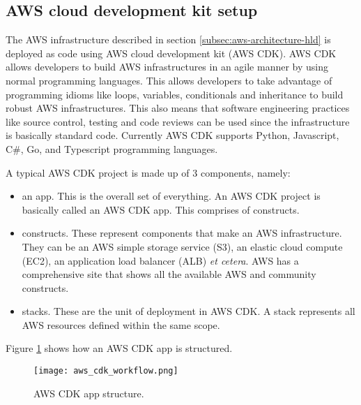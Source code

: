 


\subsection{AWS cloud development kit setup}
\label{subsec:aws-cdk-setup}

The AWS infrastructure described in section \ref{subsec:aws-architecture-hld} is deployed as code using AWS cloud development kit (AWS CDK). AWS CDK allows developers to build AWS infrastructures in an agile manner by using normal programming languages. This allows developers to take advantage of programming idioms like loops, variables, conditionals and inheritance to build robust AWS infrastructures. This also means that software engineering practices like source control, testing and code reviews can be used since the infrastructure is basically standard code. Currently AWS CDK supports Python, Javascript, C\#, Go, and Typescript programming languages.

A typical AWS CDK project is made up of 3 components, namely:

\begin{itemize}
    \item an app. This is the overall set of everything. An AWS CDK project is basically called an AWS CDK app. This comprises of constructs.
    \item constructs. These represent components that make an AWS infrastructure. They can be an AWS simple storage service (S3), an elastic cloud compute (EC2), an application load balancer (ALB) \textit{et cetera}. AWS has a comprehensive site that shows all the available AWS and community constructs\cite{awsconstructhub}.
    \item stacks. These are the unit of deployment in AWS CDK. A stack represents all AWS resources defined within the same scope.
\end{itemize}

Figure \ref{fig:aws-cdk-app-structure} shows how an AWS CDK app is structured.

\begin{figure}[H]
    \centering \texttt{[image: aws\_cdk\_workflow.png]}
    \caption{AWS CDK app structure.}
    \label{fig:aws-cdk-app-structure}
\end{figure}

